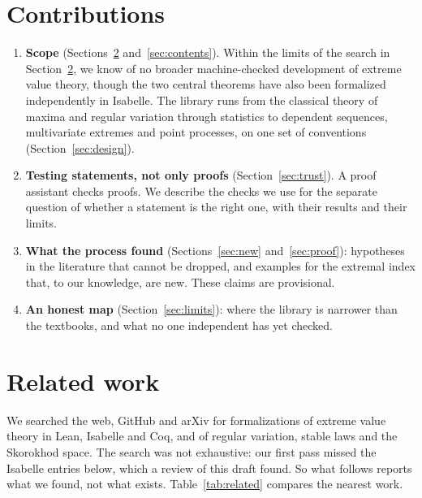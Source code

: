 \documentclass[11pt]{article}
\begin{document}
\section{Contributions}

\begin{enumerate}
  \item \textbf{Scope} (Sections~\ref{sec:related} and~\ref{sec:contents}). Within the limits of the search in Section~\ref{sec:related}, we know of no broader machine-checked development of extreme value theory, though the two central theorems have also been formalized independently in Isabelle.
        The library runs from the classical theory of maxima and regular variation through statistics to dependent sequences, multivariate extremes and point processes, on one set of conventions (Section~\ref{sec:design}).
  \item \textbf{Testing statements, not only proofs} (Section~\ref{sec:trust}). A proof assistant
        checks proofs. We describe the checks we use for the separate question of whether a statement is the right one, with their results and their limits.
  \item \textbf{What the process found} (Sections~\ref{sec:new} and~\ref{sec:proof}): hypotheses in the literature that cannot be
        dropped, and examples for the extremal index that, to our knowledge, are new. These claims are provisional.
  \item \textbf{An honest map} (Section~\ref{sec:limits}): where the library is narrower than the textbooks, and what no one independent has yet checked.
\end{enumerate}

\section{Related work}\label{sec:related}

We searched the web, GitHub and arXiv for formalizations of extreme value theory in Lean, Isabelle and Coq, and of regular variation, stable laws and the Skorokhod space. The search was
not exhaustive: our first pass missed the Isabelle entries below, which a review of this draft found. So what follows reports what we found, not what exists. Table~\ref{tab:related} compares the nearest work.
\end{document}
